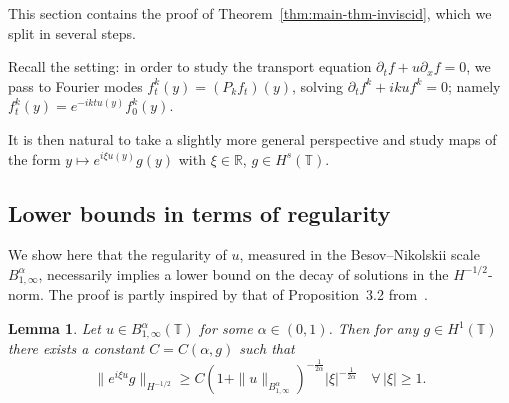 \documentclass[11pt,oneside,reqno]{amsart}
\newtheorem{lemma}[theorem]{Lemma}
\numberwithin{equation}{section}
\begin{document}
This section contains the proof of Theorem~\ref{thm:main-thm-inviscid}, which
we split in several steps.

Recall the setting: in order to study the transport equation $\partial_t f + u
\partial_x f = 0$, we pass to Fourier modes $f^k_t (y) = (P_k f_t) (y)$,
solving $\partial_t f^k + i k u f^k = 0$; namely $f^k_t (y) = e^{- i k t u
(y)} f^k_0 (y)$.

It is then natural to take a slightly more general perspective and study maps
of the form $y \mapsto e^{i \xi u (y)} g (y)$ with $\xi \in \mathbb{R}$, $g
\in H^s (\mathbb{T})$.

\subsection{Lower bounds in terms of
regularity}\label{sec:lower-bound-inviscid}

We show here that the regularity of $u$, measured in the Besov--Nikolskii
scale $B^{\alpha}_{1, \infty}$, necessarily implies a lower bound on the decay
of solutions in the $H^{- 1 / 2}$-norm. The proof is partly inspired by that
of Proposition~3.2 from~{\cite{colombozelati}}.

\begin{lemma}
  \label{lem:inviscid-lower-bound}Let $u \in B^{\alpha}_{1, \infty}
  (\mathbb{T})$ for some $\alpha \in (0, 1)$. Then for any $g \in H^1
  (\mathbb{T})$ there exists a constant $C = C (\alpha, g)$ such that
  \begin{equation}
    \| e^{i \xi u} g \|_{H^{- 1 / 2}} \geqslant C (1 + \| u \|_{B^{\alpha}_{1,
    \infty}})^{- \frac{1}{2 \alpha}}  | \xi |^{- \frac{1}{2 \alpha}} \quad
    \forall \, | \xi | \geqslant 1. \label{eq:inviscid-lower-bound}
  \end{equation}
\end{lemma}
\end{document}
